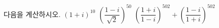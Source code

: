 다음을 계산하시오.
 $(1+i)^{10}$
 $\left(\dfrac{1-i}{\sqrt{2}}\right)^{50}$
 $\left(\dfrac{1+i}{1-i}\right)^{502}+\left(\dfrac{1-i}{1+i}\right)^{502}$
